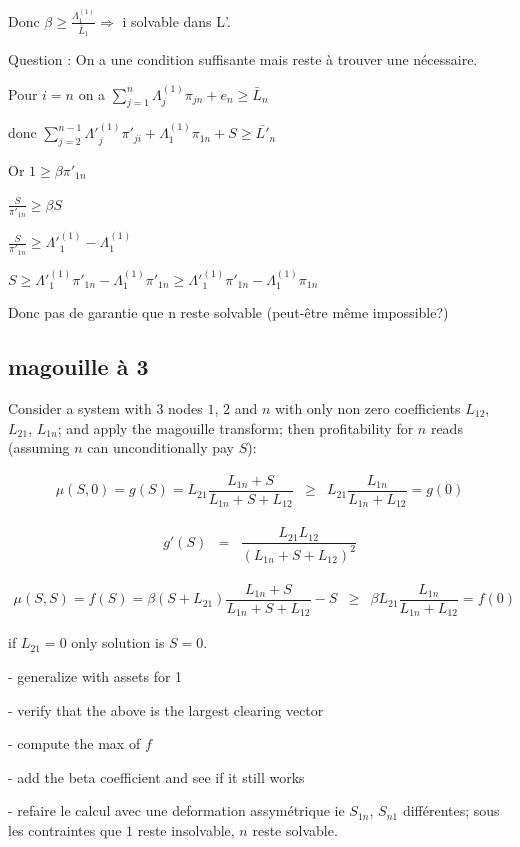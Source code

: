 \documentclass{article}
\def\AR#1{
\[
\begin{array}{llllllll}
#1
\end{array}
\]
}
\begin{document}
Donc $\beta \geq \frac{\Lambda^{(1)}_{1}}{\bar{L}_{1}} \Rightarrow$ i solvable dans L'.

Question : On a une condition suffisante mais reste à trouver une nécessaire.

\begin{center}
Pour $i = n$ on a $ \sum_{j=1}^{n} \Lambda^{(1)}_{j} \pi_{jn} + e_{n} \geq \bar{L}_{n}$

donc $ \sum_{j=2}^{n-1} \Lambda'^{(1)}_{j} \pi'_{ji} + \Lambda^{(1)}_{1} \pi_{1n} + S \geq \bar{L'}_{n}$ 
\end{center}

Or $1 \geq \beta \pi'_{1n}$

$\frac{S}{\pi'_{1n}} \geq \beta S$

$\frac{S}{\pi'_{1n}} \geq \Lambda'^{(1)}_{1} - \Lambda^{(1)}_{1}$

$S \geq \Lambda'^{(1)}_{1} \pi'_{1n} - \Lambda^{(1)}_{1} \pi'_{1n} \geq \Lambda'^{(1)}_{1} \pi'_{1n} - \Lambda^{(1)}_{1} \pi_{1n}$

Donc pas de garantie que n reste solvable (peut-être même impossible?)

\subsection{magouille à 3}
Consider a system with 3 nodes $1$, $2$ and $n$ with only non zero coefficients $L_{12}$, $L_{21}$, $L_{1n}$; and apply the magouille transform; then profitability for $n$ reads (assuming $n$ can unconditionally pay $S$):
\AR{
\mu(S,0) =
g(S) =
L_{21}
\dfrac
{L_{1n}+S}
{L_{1n}+S+L_{12}}
&\geq&
L_{21}
\dfrac
{L_{1n}}
{L_{1n}+L_{12}}
= g(0)
}

\AR{
g'(S) 
&=&
\dfrac
{L_{21}L_{12}}
{(L_{1n}+S+L_{12})^2}
}



\AR{
\mu(S,S) = 
f(S) =
\beta
(S + L_{21}) 
\dfrac
{L_{1n}+S}
{L_{1n}+S+L_{12}}
- S
&\geq&
\beta
L_{21}
\dfrac
{L_{1n}}
{L_{1n}+L_{12}}
= f(0)
}
if $L_{21}=0$ only solution is $S=0$. 

- generalize with assets for 1

- verify that the above is the largest clearing vector

- compute the max of $f$

- add the beta coefficient and see if it still works

- refaire le calcul avec une deformation assymétrique ie $S_{1n}$, $S_{n1}$
différentes; sous les contraintes que $1$ reste insolvable, $n$ reste solvable.
\end{document}
